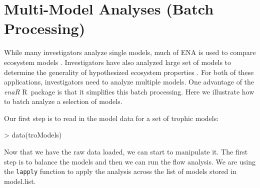 \documentclass[11pt]{article}
\def\R{\textsf{R}}
\begin{document}
\section{Multi-Model Analyses (Batch Processing)}

While many investigators analyze single models, much of ENA is used to
compare ecosystem models \citep[e.g.,][]{baird91, baird95, christian03,
  whipple07}.  Investigators have also analyzed large set of models to
determine the generality of hypothesized ecosystem properties
\citep[e.g.,][]{christensen95, borrett10_hmg, salas11_did}.  For both
of these applications, investigators need to analyze multiple models.
One advantage of the \textit{enaR} \R\ package is that it simplifies this
batch processing.  Here we illustrate how to batch analyze a
selection of models.

Our first step is to read in the model data for a set of trophic
models:

\begin{Schunk}
\begin{Sinput}
> data(troModels)
\end{Sinput}
\end{Schunk}


Now that we have the raw data loaded, we can start to manipulate
it.  The first step is to balance the models and then we can run the
flow analysis.  We are using the \texttt{lapply} function to apply the
analysis across the list of models stored in model.list.
\end{document}
